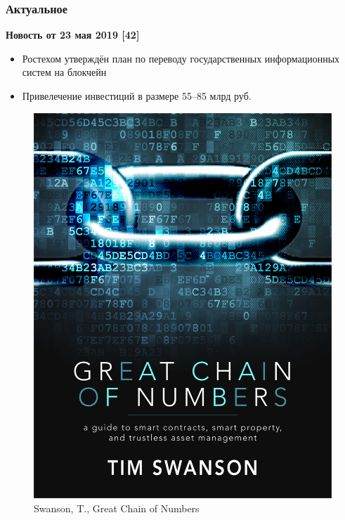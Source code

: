 \documentclass{beamer}
\begin{document}
\begin{frame}
    \frametitle{Актуальное}
    \textbf{Новость от 23 мая 2019 [42]}\\
    \begin{itemize}
        \item Ростехом утверждён план по переводу государственных
              информационных систем на блокчейн
        \item Привелечение инвестиций в размере 55–85 млрд руб.
    \end{itemize}
\end{frame}

\begin{frame}
    \begin{figure}
        \includegraphics[height=0.9\textheight]{tim_obl}
        \caption{Swanson, T., Great Chain of Numbers}
    \end{figure}
\end{frame}

\end{document}
